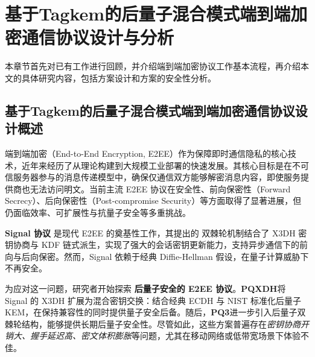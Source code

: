  \chapter{基于Tagkem的后量子混合模式端到端加密通信协议设计与分析}\label{chap:third}
本章节首先对已有工作进行回顾，并介绍端到端加密协议工作基本流程，再介绍本文的具体研究内容，包括方案设计和方案的安全性分析。
\newcommand{\KDF}{\textsf{KDF}}
\renewcommand{\DH}{\textsf{DH}}
\newcommand{\tg}{\textsf{tag}}
\newcommand{\CT}{\textsf{CT}}
\newcommand{\PK}{\textsf{PK}}
\newcommand{\SK}{\textsf{SK}}
\newcommand{\SSK}{\textsf{SSK}}
\newcommand{\ISK}{\textsf{ISK}}
\newcommand{\RSK}{\textsf{rsk}}
\newcommand{\ESK}{\textsf{ESK}}
\newcommand{\OSK}{\textsf{OSK}}
\newcommand{\PQMSK}{\textsf{PQMSK}}
\newcommand{\IPK}{\textsf{IPK}}
\newcommand{\SPK}{\textsf{SPK}}
\newcommand{\EPK}{\textsf{EPK}}
\newcommand{\OPK}{\textsf{OPK}}
\newcommand{\RPK}{\textsf{rpk}}
\newcommand{\CK}{\textsf{ck}}
\newcommand{\RK}{\textsf{rk}}
\newcommand{\MK}{\textsf{mk}}
\newcommand{\PQMPK}{\textsf{PQMPK}}

\section{基于Tagkem的后量子混合模式端到端加密通信协议设计概述}
端到端加密（End-to-End Encryption, E2EE）作为保障即时通信隐私的核心技术，近年来经历了从理论构建到大规模工业部署的快速发展。其核心目标是在不可信服务器参与的消息传递模型中，确保仅通信双方能够解密消息内容，即使服务提供商也无法访问明文。当前主流 E2EE 协议在安全性、前向保密性（Forward Secrecy）、后向保密性（Post-compromise Security）等方面取得了显著进展，但仍面临效率、可扩展性与抗量子安全等多重挑战。

\textbf{Signal 协议} 是现代 E2EE 的奠基性工作，其提出的 双棘轮机制结合了 X3DH 密钥协商与 KDF 链式派生，实现了强大的会话密钥更新能力，支持异步通信下的前向与后向保密。然而，Signal 依赖于经典 Diffie-Hellman 假设，在量子计算威胁下不再安全。

为应对这一问题，研究者开始探索 \textbf{后量子安全的 E2EE 协议}。\textbf{PQXDH}将 Signal 的 X3DH 扩展为混合密钥交换：结合经典 ECDH 与 NIST 标准化后量子 KEM，在保持兼容性的同时提供量子安全后备。随后，\textbf{PQ3}进一步引入后量子双棘轮结构，能够提供长期后量子安全性。尽管如此，这些方案普遍存在\textit{密钥协商开销大、握手延迟高、密文体积膨胀}等问题，尤其在移动网络或低带宽场景下体验不佳。

